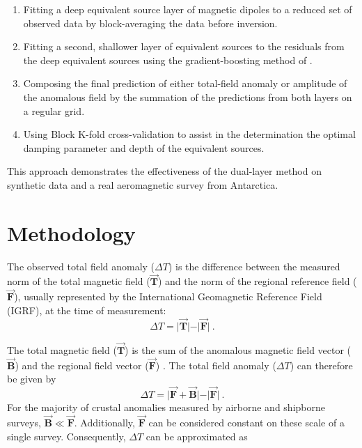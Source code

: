 \begin{enumerate}
  \item Fitting a deep equivalent source layer of magnetic dipoles to a reduced set of observed data by block-averaging the data before inversion.
  \item Fitting a second, shallower layer of equivalent sources to the residuals from the deep equivalent sources using the gradient-boosting method of \citet{Soler2021}.
  \item Composing the final prediction of either total-field anomaly or amplitude of the anomalous field by the summation of the predictions from both layers on a regular grid.
  \item Using Block K-fold cross-validation to assist in the determination the optimal damping parameter and depth of the equivalent sources.
\end{enumerate}

\noindent
This approach demonstrates the effectiveness of the dual-layer method on synthetic data and a real aeromagnetic survey from Antarctica.


\section{Methodology}

The observed total field anomaly ($\Delta T$) is the difference between the measured norm of the total magnetic field ($\vec{\mathbf{T}}$) and the norm of the regional reference field ($\vec{\mathbf{F}}$), usually represented by the International Geomagnetic Reference Field (IGRF), at the time of measurement:
\begin{equation}
    \Delta T = \vert \vec{\mathbf{T}} \vert - \vert \vec{\mathbf{F}} \vert
    \ .
\end{equation}

\noindent
The total magnetic field ($\vec{\mathbf{T}}$) is the sum of the anomalous magnetic field vector ($\vec{\mathbf{B}}$) and the regional field vector ($\vec{\mathbf{F}}$) \citep{Blakley1995, Langel1998, OliveiraJr2015}. The total field anomaly ($\Delta T$) can therefore be given by
\begin{equation}
    \Delta T = \vert \vec{\mathbf{F}} + \vec{\mathbf{B}} \vert - \vert \vec{\mathbf{F}} \vert
    \ .
\end{equation}
\noindent
For the majority of crustal anomalies measured by airborne and shipborne surveys, $\vec{\mathbf{B}} \ll \vec{\mathbf{F}}$. Additionally, $\vec{\mathbf{F}}$ can be considered constant on these scale of a single survey. Consequently, $\Delta T$ can be approximated as

